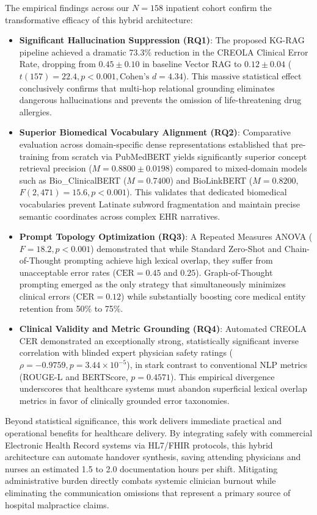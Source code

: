 \documentclass[11pt, a4paper]{article}
\begin{document}
The empirical findings across our $N = 158$ inpatient cohort confirm the transformative efficacy of this hybrid architecture:
\begin{itemize}
  \item \textbf{Significant Hallucination Suppression (RQ1)}: The proposed KG-RAG pipeline achieved a dramatic 73.3\% reduction in the CREOLA Clinical Error Rate, dropping from $0.45 \pm 0.10$ in baseline Vector RAG to $0.12 \pm 0.04$ ($t(157) = 22.4, p < 0.001, \text{Cohen's } d = 4.34$). This massive statistical effect conclusively confirms that multi-hop relational grounding eliminates dangerous hallucinations and prevents the omission of life-threatening drug allergies.
  \item \textbf{Superior Biomedical Vocabulary Alignment (RQ2)}: Comparative evaluation across domain-specific dense representations established that pre-training from scratch via PubMedBERT yields significantly superior concept retrieval precision ($M = 0.8800 \pm 0.0198$) compared to mixed-domain models such as Bio\_ClinicalBERT ($M = 0.7400$) and BioLinkBERT ($M = 0.8200$, $F(2, 471) = 15.6, p < 0.001$). This validates that dedicated biomedical vocabularies prevent Latinate subword fragmentation and maintain precise semantic coordinates across complex EHR narratives.
  \item \textbf{Prompt Topology Optimization (RQ3)}: A Repeated Measures ANOVA ($F = 18.2, p < 0.001$) demonstrated that while Standard Zero-Shot and Chain-of-Thought prompting achieve high lexical overlap, they suffer from unacceptable error rates ($\text{CER} = 0.45$ and $0.25$). Graph-of-Thought prompting emerged as the only strategy that simultaneously minimizes clinical errors ($\text{CER} = 0.12$) while substantially boosting core medical entity retention from 50\% to 75\%.
  \item \textbf{Clinical Validity and Metric Grounding (RQ4)}: Automated CREOLA CER demonstrated an exceptionally strong, statistically significant inverse correlation with blinded expert physician safety ratings ($\rho = -0.9759, p = 3.44 \times 10^{-5}$), in stark contrast to conventional NLP metrics (ROUGE-L and BERTScore, $p = 0.4571$). This empirical divergence underscores that healthcare systems must abandon superficial lexical overlap metrics in favor of clinically grounded error taxonomies.
\end{itemize}

Beyond statistical significance, this work delivers immediate practical and operational benefits for healthcare delivery. By integrating safely with commercial Electronic Health Record systems via HL7/FHIR protocols, this hybrid architecture can automate handover synthesis, saving attending physicians and nurses an estimated 1.5 to 2.0 documentation hours per shift. Mitigating administrative burden directly combats systemic clinician burnout while eliminating the communication omissions that represent a primary source of hospital malpractice claims.
\end{document}
